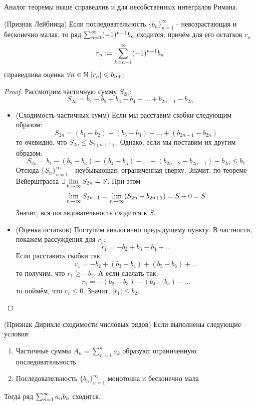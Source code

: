 \begin{note}
	Аналог теоремы выше справедлив и для несобственных интегралов Римана.
\end{note}

\begin{theorem} (Признак Лейбница)
	Если последовательность $\{b_n\}_{n = 1}^\infty$ - невозрастающая и бесконечно малая, то ряд $\sum_{n = 1}^\infty (-1)^{n + 1} b_n$ сходится, причём для его остатков $r_n$
	\[
		r_n := \sum\limits_{k = n + 1}^\infty (-1)^{n + 1} b_n
	\]
	справедлива оценка $\forall n \in \mathbb{N}\ |r_n| \leqslant b_{n + 1}$
\end{theorem}

\begin{proof}
	Рассмотрим частичную сумму $S_{2n}$:
	\[
		S_{2n} = b_1 - b_2 + b_3 - b_4 + \ldots + b_{2n - 1} - b_{2n}
	\]
	\begin{itemize}
		\item (Сходимость частичных сумм) Если мы расставим скобки следующим образом:
		\[
			S_{2n} = (b_1 - b_2) + (b_3 - b_4) + \ldots + (b_{2n - 1} - b_{2n})
		\]
		то очевидно, что $S_{2n} \le S_{2(n + 1)}$. Однако, если мы поставим их другим образом:
		\[
			S_{2n} = b_1 - (b_2 - b_3) - (b_4 - b_5) - \ldots - (b_{2n - 2} - b_{2n - 1}) - b_{2n} \le b_1
		\]
		Отсюда $\{S_n\}_{n = 1}^\infty$ - неубывающая, ограниченная сверху. Значит, по теореме Вейерштрасса $\exists \lim\limits_{n \to \infty} S_{2n} = S$. При этом
		\[
			\lim\limits_{n \to \infty} S_{2n + 1} = \lim\limits_{n \to \infty} (S_{2n} + b_{2n + 1}) = S + 0 = S
		\]
		Значит, вся последовательность сходится к $S$.
		
		\item (Оценка остатков) Поступим аналогично предыдущему пункту. В частности, покажем рассуждения для $r_1$:
		\[
			r_1 = -b_2 + b_3 - b_4 + \ldots
		\]
		Если расставить скобки так:
		\[
			r_1 = -b_2 + (b_3 - b_4) + (b_5 - b_6) + \ldots
		\]
		то получим, что $r_1 \ge -b_2$. А если сделать так:
		\[
			r_1 = -(b_2 - b_3) - (b_4 - b_5) - \ldots
		\]
		то поймём, что $r_1 \le 0$. Значит, $|r_1| \le b_2$.
	\end{itemize}
\end{proof}

\begin{theorem} (Признак Дирихле сходимости числовых рядов)
	Если выполнены следующие условия:
	\begin{enumerate}
		\item Частичные суммы $A_n = \sum_{n = 1}^k a_k$ образуют ограниченную последовательность
		
		\item Последовательность $\{b_n\}_{n = 1}^\infty$ монотонна и бесконечно мала
	\end{enumerate}
	Тогда ряд $\sum_{n = 1}^\infty a_n b_n$ сходится.
\end{theorem}

